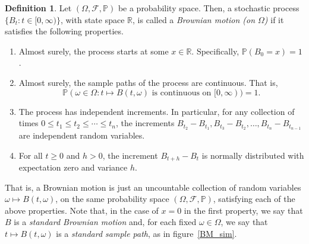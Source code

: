 \documentclass[a4paper,11pt]{article}
\theoremstyle{plain}
\theoremstyle{definition}
\newtheorem{definition}[theorem]{Definition}
\begin{document}
\begin{definition}
Let $(\Omega,\mathcal{F},\mathbb{P})$ be a probability space. Then, a stochastic process $\{B_t:t \in [0,\infty)\}$, with state space $\mathbb{R}$, is called a \textit{Brownian motion (on $\Omega$)} if it satisfies the following properties.



\begin{enumerate}
\item Almost surely, the process starts at some $x \in \mathbb{R}$. Specifically, $\mathbb{P}(B_0 = x) = 1$.
\item Almost surely, the sample paths of the process are continuous. That is,
\[
\mathbb{P}(\omega \in \Omega: t \mapsto B(t,\omega) \text{ is continuous on }[0,\infty)) = 1.
\]
\item The process has independent increments. In particular, for any collection of times $0 \leq t_1 \leq t_2 \leq \cdots \leq t_n$, the increments $B_{t_2} - B_{t_1}, B_{t_3} - B_{t_2}, \dots , B_{t_n} - B_{t_{n-1}}$ are independent random variables.
\item For all $t \geq 0$ and $h > 0$, the increment $B_{t + h} - B_{t}$ is normally distributed with expectation zero and variance $h$.
\end{enumerate}
\end{definition}

That is, a Brownian motion is just an uncountable collection of random variables $\omega \mapsto B(t,\omega)$, on the same probability space $(\Omega,\mathcal{F},\mathbb{P})$, satisfying each of the above properties. Note that, in the case of $x = 0$ in the first property, we say that $B$ is a \textit{standard Brownian motion} and, for each fixed $\omega \in \Omega$, we say that $t \mapsto B(t,\omega)$ is a \textit{standard sample path}, as in figure~\ref{BM_sim}.
\end{document}

